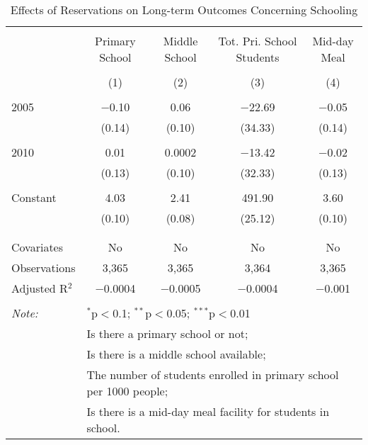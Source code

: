 
\begin{table}[!htbp] \centering 
  \caption{Effects of Reservations on Long-term Outcomes Concerning Schooling} 
  \label{raj_shrug_schooling_05_10} 
\scriptsize 
\begin{tabular}{@{\extracolsep{5pt}}lcccc} 
\\[-1.8ex]\hline 
\hline \\[-1.8ex] 
 & Primary School & Middle School & Tot. Pri. School Students & Mid-day Meal \\ 
\\[-1.8ex] & (1) & (2) & (3) & (4)\\ 
\hline \\[-1.8ex] 
 2005 & $-$0.10 & 0.06 & $-$22.69 & $-$0.05 \\ 
  & (0.14) & (0.10) & (34.33) & (0.14) \\ 
  & & & & \\ 
 2010 & 0.01 & 0.0002 & $-$13.42 & $-$0.02 \\ 
  & (0.13) & (0.10) & (32.33) & (0.13) \\ 
  & & & & \\ 
 Constant & 4.03 & 2.41 & 491.90 & 3.60 \\ 
  & (0.10) & (0.08) & (25.12) & (0.10) \\ 
  & & & & \\ 
\hline \\[-1.8ex] 
Covariates & No & No & No & No \\ 
Observations & 3,365 & 3,365 & 3,364 & 3,365 \\ 
Adjusted R$^{2}$ & $-$0.0004 & $-$0.0005 & $-$0.0004 & $-$0.001 \\ 
\hline 
\hline \\[-1.8ex] 
\textit{Note:}  & \multicolumn{4}{l}{$^{*}$p$<$0.1; $^{**}$p$<$0.05; $^{***}$p$<$0.01} \\ 
 & \multicolumn{4}{l}{Is there a primary school or not;} \\ 
 & \multicolumn{4}{l}{Is there is a middle school available;} \\ 
 & \multicolumn{4}{l}{The number of students enrolled in primary school per 1000 people;} \\ 
 & \multicolumn{4}{l}{Is there is a mid-day meal facility for students in school.} \\ 
\end{tabular} 
\end{table} 
